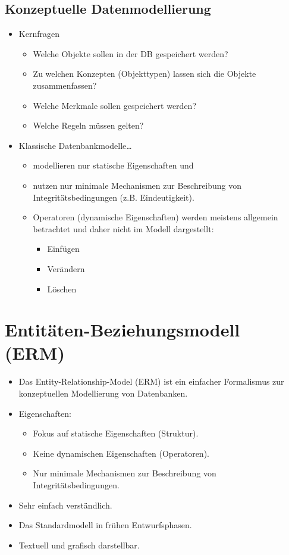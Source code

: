 		\subsection{Konzeptuelle Datenmodellierung} %
			\begin{itemize}
				\item Kernfragen
					\begin{itemize}
						\item Welche Objekte sollen in der DB gespeichert werden?
						\item Zu welchen Konzepten (Objekttypen) lassen sich die Objekte zusammenfassen?
						\item Welche Merkmale sollen gespeichert werden?
						\item Welche Regeln müssen gelten?
					\end{itemize}
				\item Klassische Datenbankmodelle\dots
					\begin{itemize}
						\item modellieren nur statische Eigenschaften und
						\item nutzen nur minimale Mechanismen zur Beschreibung von Integritätsbedingungen (z.B. Eindeutigkeit).
						\item Operatoren (dynamische Eigenschaften) werden meistens allgemein betrachtet und daher nicht im Modell dargestellt:
							\begin{itemize}
								\item Einfügen
								\item Verändern
								\item Löschen
							\end{itemize}
					\end{itemize}
			\end{itemize}

	\section{Entitäten-Beziehungsmodell (ERM)} %
		\begin{itemize}
			\item Das Entity-Relationship-Model (ERM) ist ein einfacher Formalismus zur konzeptuellen Modellierung von Datenbanken.
			\item Eigenschaften:
				\begin{itemize}
					\item Fokus auf statische Eigenschaften (Struktur).
					\item Keine dynamischen Eigenschaften (Operatoren).
					\item Nur minimale Mechanismen zur Beschreibung von Integritätsbedingungen.
				\end{itemize}
			\item Sehr einfach verständlich.
			\item Das Standardmodell in frühen Entwurfsphasen.
			\item Textuell und grafisch darstellbar.
		\end{itemize}

